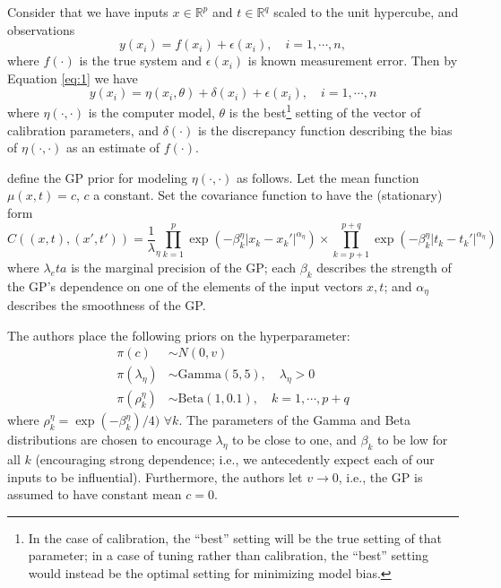 \documentclass{article}
\begin{document}
Consider that we have inputs $x\in \mathbb R^p$ and $t\in\mathbb R^q$ scaled to the unit hypercube, and observations 
\begin{equation}\label{eq:2}
y(x_i) = f(x_i) + \epsilon(x_i),\quad i=1,\cdots,n,
\end{equation}
where $f(\cdot)$ is the true system and $\epsilon(x_i)$ is known measurement error. Then by Equation \ref{eq:1} we have
\begin{equation}\label{eq:2}
y(x_i) = \eta(x_i,\theta) + \delta(x_i) + \epsilon(x_i),\quad i=1,\cdots,n
\end{equation}
where $\eta(\cdot,\cdot)$ is the computer model, $\theta$ is the best\footnote{In the case of calibration, the ``best'' setting will be the true setting of that parameter; in a case of tuning rather than calibration, the ``best'' setting would instead be the optimal setting for minimizing model bias.}
setting of the vector of calibration parameters, and $\delta(\cdot)$ is the discrepancy function describing the bias of $\eta(\cdot,\cdot)$ as an estimate of $f(\cdot)$.

\citeauthor*{Williams2006} define the GP prior for modeling $\eta(\cdot,\cdot)$ as follows. Let the mean function $\mu(x,t)=c$, $c$ a constant. Set the covariance function to have the (stationary) form 
\begin{equation}\label{eq:Hig_cov}
C((x,t),(x',t')) = \frac 1\lambda_\eta \prod_{k=1}^{p}
\exp \left(-\beta^\eta_k|x_k-x_k'|^{\alpha_\eta}\right) \times
\prod_{k=p+1}^{p+q}
\exp \left(-\beta^\eta_{k}|t_k-t_k'|^{\alpha_\eta}\right)
\end{equation}
where $\lambda_eta$ is the marginal precision of the GP; each $\beta_k$ describes the strength of the GP's dependence on one of the elements of the input vectors $x,t$; and $\alpha_\eta$ describes the smoothness of the GP. 

The authors place the following priors on the hyperparameter:
\begin{align}
\pi (c) &\sim N(0,v)\\
\pi(\lambda_\eta) &\sim \mathrm{Gamma}(5,5),\quad\lambda_\eta>0\\
\pi\left(\rho_k^\eta\right) &\sim \mathrm{Beta}(1,0.1),\quad k=1,\cdots,p+q
\end{align}
where $\rho_k^\eta=\exp(-\beta_k^\eta)/4)$ $\forall k$. The parameters of the Gamma and Beta distributions are chosen to encourage $\lambda_\eta$ to be close to one, and $\beta_k$ to be low for all $k$ (encouraging strong dependence; i.e., we antecedently expect each of our inputs to be influential). Furthermore, the authors let $v\to0$, i.e., the GP is assumed to have constant mean $c=0$.
\end{document}
